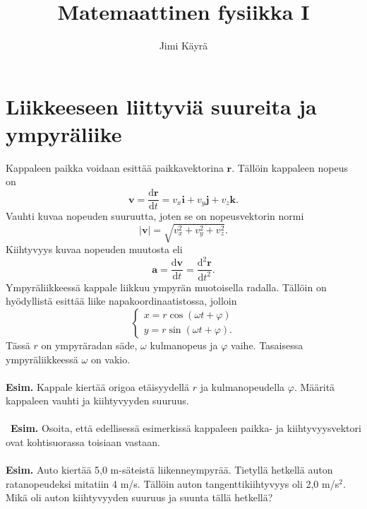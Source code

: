 \documentclass{article}
\date{}
\title{\textbf{Matemaattinen fysiikka I}}
\author{Jimi Käyrä}
\begin{document}
\begin{titlepage}
\maketitle
\tableofcontents
\end{titlepage}

\section{Liikkeeseen liittyviä suureita ja ympyräliike}
Kappaleen paikka voidaan esittää paikkavektorina \(\mathbf{r}\). Tällöin kappaleen nopeus on $$\mathbf{v}=\frac{\text{d}\mathbf{r}}{\text{d}t}=v_x \mathbf{i}+v_y \mathbf{j}+v_z \mathbf{k}.$$ Vauhti kuvaa nopeuden suuruutta, joten se on nopeusvektorin normi $$|\mathbf{v}|=\sqrt{v_x^2+v_y^2+v_z^2}.$$ Kiihtyvyys kuvaa nopeuden muutosta eli $$\mathbf{a}=\frac{\text{d}\mathbf{v}}{\text{d}t}=\frac{\text{d}^2\mathbf{r}}{\text{d}t^2}.$$ Ympyräliikkeessä kappale liikkuu ympyrän muotoisella radalla. Tällöin on hyödyllistä esittää liike napakoordinaatistossa, jolloin $$\begin{cases}x=r\cos (\omega t+\varphi) \\ y=r\sin (\omega t+\varphi).\end{cases}$$ Tässä \(r\) on ympyräradan säde, \(\omega\) kulmanopeus ja \(\varphi\) vaihe. Tasaisessa ympyräliikkeessä \(\omega\) on vakio.\\
 \\
\textbf{Esim.} Kappale kiertää origoa etäisyydellä \(r\) ja kulmanopeudella \(\varphi\). Määritä kappaleen vauhti ja kiihtyvyyden suuruus.\\
 \\\
\textbf{Esim.} Osoita, että edellisessä esimerkissä kappaleen paikka- ja kiihtyvyysvektori ovat kohtisuorassa toisiaan vastaan.\\
 \\
\textbf{Esim.} Auto kiertää 5,0 m-säteistä liikenneympyrää. Tietyllä hetkellä auton ratanopeudeksi mitatiin 4 m/s. Tällöin auton tangenttikiihtyvyys oli 2,0 m/s\(^2\). Mikä oli auton kiihtyvyyden suuruus ja suunta tällä hetkellä?

\newpage
\end{document}
